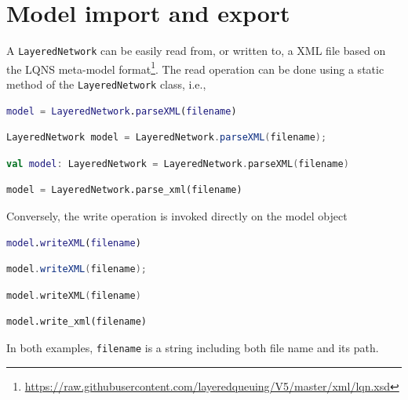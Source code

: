 \section{Model import and export}
A \texttt{LayeredNetwork} can be easily read from, or written to, a XML file based on the LQNS meta-model format\footnote{\url{https://raw.githubusercontent.com/layeredqueuing/V5/master/xml/lqn.xsd}}. The read operation can be done using a static method of the \texttt{LayeredNetwork} class, i.e.,
\begin{MATLAB}
\begin{lstlisting}[language = matlab]
model = LayeredNetwork.parseXML(filename)
\end{lstlisting}
\end{MATLAB}
\begin{JAVA}
\begin{lstlisting}[language = java, basicstyle=\ttfamily\scriptsize]
LayeredNetwork model = LayeredNetwork.parseXML(filename);
\end{lstlisting}
\end{JAVA}
\begin{KOTLIN}
\begin{lstlisting}[language = kotlin, basicstyle=\ttfamily\scriptsize]
val model: LayeredNetwork = LayeredNetwork.parseXML(filename)
\end{lstlisting}
\end{KOTLIN}
\begin{PYTHON}
\begin{lstlisting}[language=python]
model = LayeredNetwork.parse_xml(filename)
\end{lstlisting}
\end{PYTHON}
Conversely, the write operation is invoked directly on the model object
\begin{MATLAB}
\begin{lstlisting}[language = matlab]
model.writeXML(filename)
\end{lstlisting}
\end{MATLAB}
\begin{JAVA}
\begin{lstlisting}[language = java, basicstyle=\ttfamily\scriptsize]
model.writeXML(filename);
\end{lstlisting}
\end{JAVA}
\begin{KOTLIN}
\begin{lstlisting}[language = kotlin, basicstyle=\ttfamily\scriptsize]
model.writeXML(filename)
\end{lstlisting}
\end{KOTLIN}
\begin{PYTHON}
\begin{lstlisting}[language=python]
model.write_xml(filename)
\end{lstlisting}
\end{PYTHON}
In both examples, \texttt{filename} is a string including both file name and its path.

